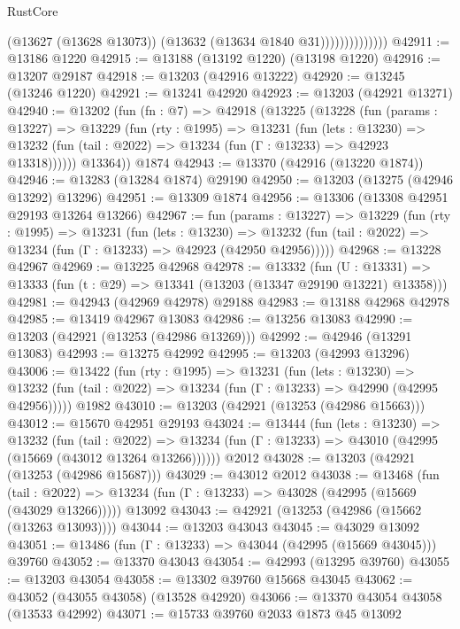 \begin{lexlean}{RustCore}
\begin{coremodule}
                            (@13627 (@13628 @13073))
                            (@13632 (@13634 @1840 @31))))))))))))))
@42911 := @13186 @1220
@42915 := @13188 (@13192 @1220) (@13198 @1220)
@42916 := @13207 @29187
@42918 := @13203 (@42916 @13222)
@42920 := @13245 (@13246 @1220)
@42921 := @13241 @42920
@42923 := @13203 (@42921 @13271)
@42940 := @13202
    (fun (fn : @7) =>
    @42918
      (@13225
        (@13228
          (fun (params : @13227) =>
          @13229
            (fun (rty : @1995) =>
            @13231
              (fun (lets : @13230) =>
              @13232 (fun (tail : @2022) => @13234 (fun (Γ : @13233) => @42923 @13318))))))
        @13364))
    @1874
@42943 := @13370 (@42916 (@13220 @1874))
@42946 := @13283 (@13284 @1874) @29190
@42950 := @13203 (@13275 (@42946 @13292) @13296)
@42951 := @13309 @1874
@42956 := @13306 (@13308 @42951 @29193 @13264 @13266)
@42967 := fun (params : @13227) =>
  @13229
    (fun (rty : @1995) =>
    @13231
      (fun (lets : @13230) =>
      @13232 (fun (tail : @2022) => @13234 (fun (Γ : @13233) => @42923 (@42950 @42956)))))
@42968 := @13228 @42967
@42969 := @13225 @42968
@42978 := @13332
    (fun (U : @13331) => @13333 (fun (t : @29) => @13341 (@13203 (@13347 @29190 @13221) @13358)))
@42981 := @42943 (@42969 @42978) @29188
@42983 := @13188 @42968 @42978
@42985 := @13419 @42967 @13083
@42986 := @13256 @13083
@42990 := @13203 (@42921 (@13253 (@42986 @13269)))
@42992 := @42946 (@13291 @13083)
@42993 := @13275 @42992
@42995 := @13203 (@42993 @13296)
@43006 := @13422
    (fun (rty : @1995) =>
    @13231
      (fun (lets : @13230) =>
      @13232 (fun (tail : @2022) => @13234 (fun (Γ : @13233) => @42990 (@42995 @42956)))))
    @1982
@43010 := @13203 (@42921 (@13253 (@42986 @15663)))
@43012 := @15670 @42951 @29193
@43024 := @13444
    (fun (lets : @13230) =>
    @13232
      (fun (tail : @2022) =>
      @13234 (fun (Γ : @13233) => @43010 (@42995 (@15669 (@43012 @13264 @13266))))))
    @2012
@43028 := @13203 (@42921 (@13253 (@42986 @15687)))
@43029 := @43012 @2012
@43038 := @13468
    (fun (tail : @2022) => @13234 (fun (Γ : @13233) => @43028 (@42995 (@15669 (@43029 @13266)))))
    @13092
@43043 := @42921 (@13253 (@42986 (@15662 (@13263 @13093))))
@43044 := @13203 @43043
@43045 := @43029 @13092
@43051 := @13486 (fun (Γ : @13233) => @43044 (@42995 (@15669 @43045))) @39760
@43052 := @13370 @43043
@43054 := @42993 (@13295 @39760)
@43055 := @13203 @43054
@43058 := @13302 @39760 @15668 @43045
@43062 := @43052 (@43055 @43058) (@13528 @42920)
@43066 := @13370 @43054 @43058 (@13533 @42992)
@43071 := @15733 @39760 @2033 @1873 @45 @13092

\end{coremodule}
\end{lexlean}
